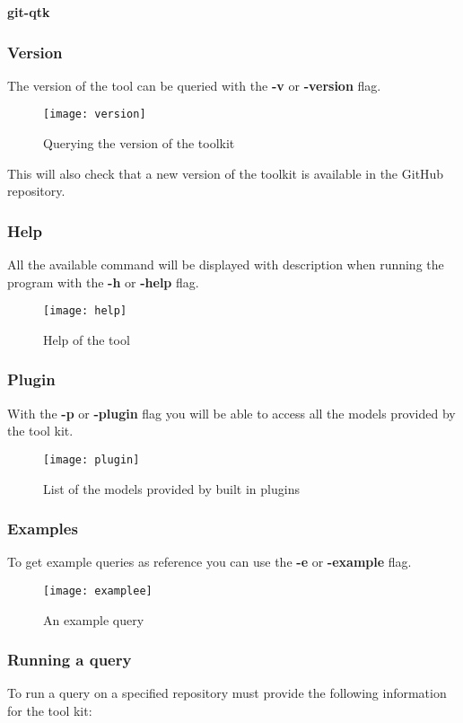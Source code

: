 \textbf{git-qtk}
\subsubsection{Version}
The version of the tool can be queried with the \textbf{-v} or \textbf{-version} flag.

\begin{figure}[H]
	\centering
	\texttt{[image: version]}
	\caption{Querying the version of the toolkit}
	\label{fig:fig-version}
\end{figure}

This will also check that a new version of the toolkit is available in the GitHub repository\cite{repo}. 

\newpage
\subsubsection{Help}
All the available command will be displayed with description when running the program with the \textbf{-h} or \textbf{-help} flag.

\begin{figure}[H]
	\centering
	\texttt{[image: help]}
	\caption{Help of the tool}
	\label{fig:fig-help}
\end{figure}

\subsubsection{Plugin}
With the \textbf{-p} or \textbf{-plugin} flag you will be able to access all the models provided by the tool kit.

\begin{figure}[H]
	\centering
	\texttt{[image: plugin]}
	\caption{List of the models provided by built in plugins}
	\label{fig:fig-plugin}
\end{figure}

\subsubsection{Examples}
To get example queries as reference you can use the \textbf{-e} or \textbf{-example} flag.

\begin{figure}[H]
	\centering
	\texttt{[image: examplee]}
	\caption{An example query}
	\label{fig:fig-example}
\end{figure}

\subsubsection{Running a query}
To run a query on a specified repository must provide the following information for the tool kit:

